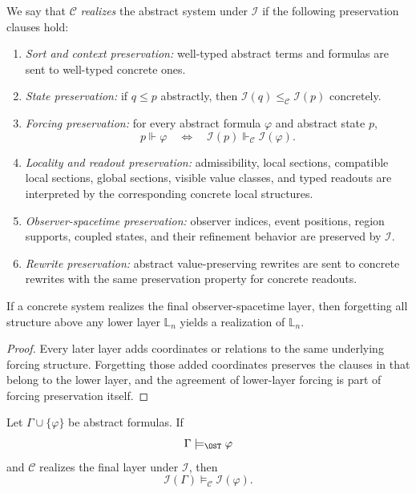 \begin{definition}[Realization]\label{def:realization}
We say that $\mathcal C$ \emph{realizes} the abstract system under $\mathcal I$ if the following preservation clauses hold:
\begin{enumerate}[label=(R\arabic*),nosep]
\item \emph{Sort and context preservation:} well-typed abstract terms and formulas are sent to well-typed concrete ones.
\item \emph{State preservation:} if $q\le p$ abstractly, then $\mathcal I(q)\le_{\mathcal C}\mathcal I(p)$ concretely.
\item \emph{Forcing preservation:} for every abstract formula $\varphi$ and abstract state $p$,
\[
p\Vdash\varphi
\quad\Longleftrightarrow\quad
\mathcal I(p)\Vdash_{\mathcal C}\mathcal I(\varphi).
\]
\item \emph{Locality and readout preservation:} admissibility, local sections, compatible local sections, global sections, visible value classes, and typed readouts are interpreted by the corresponding concrete local structures.
\item \emph{Observer-spacetime preservation:} observer indices, event positions, region supports, coupled states, and their refinement behavior are preserved by $\mathcal I$.
\item \emph{Rewrite preservation:} abstract value-preserving rewrites are sent to concrete rewrites with the same preservation property for concrete readouts.
\end{enumerate}
\end{definition}

\begin{proposition}\label{prop:lower-layer-projection}
If a concrete system realizes the final observer-spacetime layer, then forgetting all structure above any lower layer $\mathbb{L}_n$ yields a realization of $\mathbb{L}_n$.
\end{proposition}

\begin{proof}
Every later layer adds coordinates or relations to the same underlying forcing structure. Forgetting those added coordinates preserves the clauses in  that belong to the lower layer, and the agreement of lower-layer forcing is part of forcing preservation itself.
\end{proof}

\begin{proposition}\label{prop:semantic-fidelity}
Let $\Gamma\cup\{\varphi\}$ be abstract formulas. If
\[
\Gamma\models_{\OST}\varphi
\]
and $\mathcal C$ realizes the final layer under $\mathcal I$, then
\[
\mathcal I(\Gamma)\models_{\mathcal C}\mathcal I(\varphi).
\]
\end{proposition}

